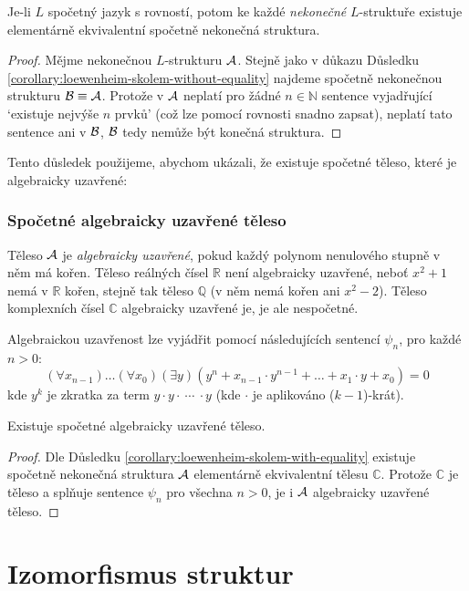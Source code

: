 \begin{corollary}\label{corollary:loewenheim-skolem-with-equality}
    Je-li $L$ spočetný jazyk s rovností, potom ke každé \emph{nekonečné} $L$-struktuře existuje elementárně ekvivalentní spočetně nekonečná struktura.
\end{corollary}
\begin{proof}
    Mějme nekonečnou $L$-strukturu $\mathcal{A}$. Stejně jako v důkazu Důsledku \ref{corollary:loewenheim-skolem-without-equality} najdeme spočetně nekonečnou strukturu $\mathcal{B}\equiv\mathcal{A}$. Protože v $\mathcal{A}$ neplatí pro žádné $n\in\mathbb N$ sentence vyjadřující `existuje nejvýše $n$ prvků' (což lze pomocí rovnosti snadno zapsat), neplatí tato sentence ani v $\mathcal{B}$, $\mathcal{B}$ tedy nemůže být konečná struktura.
\end{proof}

Tento důsledek použijeme, abychom ukázali, že existuje spočetné těleso, které je algebraicky uzavřené:  

\subsubsection*{Spočetné algebraicky uzavřené těleso}

Těleso $\mathcal{A}$ je \emph{algebraicky uzavřené}, pokud každý polynom nenulového stupně v něm má kořen. Těleso reálných čísel $\mathbb R$ není algebraicky uzavřené, neboť $x^2+1$ nemá v $\mathbb R$ kořen, stejně tak těleso $\mathbb Q$ (v něm nemá kořen ani $x^2-2$). Těleso komplexních čísel $\mathbb C$ algebraicky uzavřené je, je ale nespočetné.

Algebraickou uzavřenost lze vyjádřit pomocí následujících sentencí $\psi_n$, pro každé $n>0$:
$$
(\forall x_{n-1})\dots(\forall x_0)(\exists y)(y^n+x_{n-1}\cdot y^{n-1}+\dots+x_1\cdot y + x_0) = 0
$$
kde $y^k$ je zkratka za term $y\cdot y \cdot\ \cdots\ \cdot y$ (kde  $\cdot$ je aplikováno ($k-1$)-krát).

\begin{corollary}
    Existuje spočetné algebraicky uzavřené těleso.
\end{corollary}
\begin{proof}
    Dle Důsledku \ref{corollary:loewenheim-skolem-with-equality} existuje spočetně nekonečná struktura $\mathcal{A}$ elementárně ekvivalentní tělesu $\mathbb C$. Protože $\mathbb C$ je těleso a splňuje sentence $\psi_n$ pro všechna $n>0$, je i $\mathcal{A}$ algebraicky uzavřené těleso.
\end{proof}


\section{Izomorfismus struktur}\label{section:isomorphism-of-structures}


